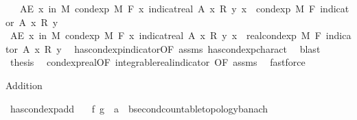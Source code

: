 \begin{isabellebody}
\ \ \ {\isachardoublequoteopen}AE\ x\ in\ M{\isachardot}{\kern0pt}\ cond{\isacharunderscore}{\kern0pt}exp\ M\ F\ {\isacharparenleft}{\kern0pt}{\isasymlambda}x{\isachardot}{\kern0pt}\ indicat{\isacharunderscore}{\kern0pt}real\ A\ x\ {\isacharasterisk}{\kern0pt}\isactrlsub R\ y{\isacharparenright}{\kern0pt}\ x\ {\isacharequal}{\kern0pt}\ cond{\isacharunderscore}{\kern0pt}exp\ M\ F\ {\isacharparenleft}{\kern0pt}indicator\ A{\isacharparenright}{\kern0pt}\ x\ {\isacharasterisk}{\kern0pt}\isactrlsub R\ y{\isachardoublequoteclose}\isanewline
%
\isadelimproof
%
\endisadelimproof
%
\isatagproof
{}\isamarkupfalse%
\ {\isacharminus}{\kern0pt}\isanewline
\ \ \isamarkupfalse%
\ {\isachardoublequoteopen}AE\ x\ in\ M{\isachardot}{\kern0pt}\ cond{\isacharunderscore}{\kern0pt}exp\ M\ F\ {\isacharparenleft}{\kern0pt}{\isasymlambda}x{\isachardot}{\kern0pt}\ indicat{\isacharunderscore}{\kern0pt}real\ A\ x\ {\isacharasterisk}{\kern0pt}\isactrlsub R\ y{\isacharparenright}{\kern0pt}\ x\ {\isacharequal}{\kern0pt}\ real{\isacharunderscore}{\kern0pt}cond{\isacharunderscore}{\kern0pt}exp\ M\ F\ {\isacharparenleft}{\kern0pt}indicator\ A{\isacharparenright}{\kern0pt}\ x\ {\isacharasterisk}{\kern0pt}\isactrlsub R\ y{\isachardoublequoteclose}\ \isamarkupfalse%
\ has{\isacharunderscore}{\kern0pt}cond{\isacharunderscore}{\kern0pt}exp{\isacharunderscore}{\kern0pt}indicator{\isacharbrackleft}{\kern0pt}OF\ assms{\isacharbrackright}{\kern0pt}\ has{\isacharunderscore}{\kern0pt}cond{\isacharunderscore}{\kern0pt}exp{\isacharunderscore}{\kern0pt}charact\ \isamarkupfalse%
\ blast\isanewline
\ \ \isamarkupfalse%
\ {\isacharquery}{\kern0pt}thesis\ \isamarkupfalse%
\ cond{\isacharunderscore}{\kern0pt}exp{\isacharunderscore}{\kern0pt}real{\isacharbrackleft}{\kern0pt}OF\ integrable{\isacharunderscore}{\kern0pt}real{\isacharunderscore}{\kern0pt}indicator{\isacharcomma}{\kern0pt}\ OF\ assms{\isacharbrackright}{\kern0pt}\ \isamarkupfalse%
\ fastforce\isanewline
{}\isamarkupfalse%
%
\endisatagproof
{\isafoldproof}%
%
\isadelimproof
%
\endisadelimproof
%
\begin{isamarkuptext}%
Addition%
\end{isamarkuptext}\isamarkuptrue%
\isamarkupfalse%
\ has{\isacharunderscore}{\kern0pt}cond{\isacharunderscore}{\kern0pt}exp{\isacharunderscore}{\kern0pt}add{\isacharcolon}{\kern0pt}\isanewline
\ \ \ f\ g\ {\isacharcolon}{\kern0pt}{\isacharcolon}{\kern0pt}\ {\isachardoublequoteopen}{\isacharprime}{\kern0pt}a\ {\isasymRightarrow}\ {\isacharprime}{\kern0pt}b{\isacharcolon}{\kern0pt}{\isacharcolon}{\kern0pt}{\isacharbraceleft}{\kern0pt}second{\isacharunderscore}{\kern0pt}countable{\isacharunderscore}{\kern0pt}topology{\isacharcomma}{\kern0pt}banach{\isacharbraceright}{\kern0pt}{\isachardoublequoteclose}\isanewline

\end{isabellebody}
